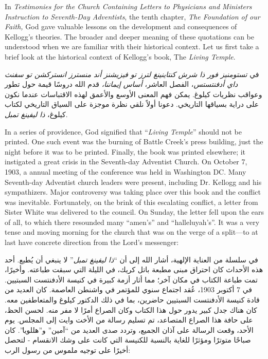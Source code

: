 



In \textit{Testimonies for the Church Containing Letters to Physicians and Ministers Instruction to Seventh-Day Adventists}, the tenth chapter, \textit{The Foundation of our Faith,} God gave valuable lessons on the development and consequences of Kellogg's theories. The broader and deeper meaning of these quotations can be understood when we are familiar with their historical context. Let us first take a brief look at the historical context of Kellogg's book, The \textit{Living Temple}.


في \textit{تستومنيز فور ذا شرش كنتاينينغ لترز تو فيزيشنز أند منسترز انستركشن تو سفنث داي أدفنتستس}، الفصل العاشر، \textit{أساس إيماننا،} قدم الله دروسًا قيمة حول تطور وعواقب نظريات كيلوغ. يمكن فهم المعنى الأوسع والأعمق لهذه الاقتباسات عندما نكون على دراية بسياقها التاريخي. دعونا أولاً نلقي نظرة موجزة على السياق التاريخي لكتاب كيلوغ، \textit{ذا ليفينغ تمبل}.


In a series of providence, God signified that “\textit{Living Temple}” should not be printed. One such event was the burning of Battle Creek's press building, just the night before it was to be printed. Finally, the book was printed elsewhere; it instigated a great crisis in the Seventh-day Adventist Church. On October 7, 1903, a annual meeting of the conference was held in Washington DC. Many Seventh-day Adventist church leaders were present, including Dr. Kellogg and his sympathizers. Major controversy was taking place over this book and the conflict was inevitable. Fortunately, on the brink of this escalating conflict, a letter from Sister White was delivered to the council. On Sunday, the letter fell upon the ears of all, to which there resounded many “amen's” and “halleluyah's”. It was a very tense and moving morning for the church that was on the verge of a split—to at last have concrete direction from the Lord's messenger:


في سلسلة من العناية الإلهية، أشار الله إلى أن “\textit{ذا ليفينغ تمبل}” لا ينبغي أن يُطبع. أحد هذه الأحداث كان احتراق مبنى مطبعة باتل كريك، في الليلة التي سبقت طباعته. وأخيرًا، تمت طباعة الكتاب في مكان آخر؛ مما أثار أزمة كبيرة في كنيسة الأدفنتست السبتيين. في 7 أكتوبر 1903، عُقد اجتماع سنوي للمؤتمر في واشنطن العاصمة. كان العديد من قادة كنيسة الأدفنتست السبتيين حاضرين، بما في ذلك الدكتور كيلوغ والمتعاطفين معه. كان هناك جدل كبير يدور حول هذا الكتاب وكان الصراع أمرًا لا مفر منه. لحسن الحظ، على حافة هذا الصراع المتصاعد، تم تسليم رسالة من الأخت وايت إلى المجلس. يوم الأحد، وقعت الرسالة على آذان الجميع، وتردد صدى العديد من “آمين” و”هللويا”. كان صباحًا متوترًا ومؤثرًا للغاية بالنسبة للكنيسة التي كانت على وشك الانقسام - لتحصل أخيرًا على توجيه ملموس من رسول الرب:


